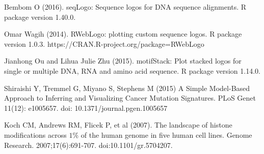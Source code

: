 \documentclass[12pt]{article}\usepackage[]{graphicx}\usepackage[usenames,dvipsnames]{color}
\begin{document}
\begin{thebibliography}{1}

Bembom O (2016).
\newblock seqLogo: Sequence logos for DNA sequence alignments.
\newblock R package version 1.40.0.

Omar Wagih (2014).
\newblock RWebLogo: plotting custom sequence logos.
\newblock R package version 1.0.3. https://CRAN.R-project.org/package=RWebLogo

Jianhong Ou and Lihua Julie Zhu  (2015).
\newblock  motifStack: Plot stacked logos for single or multiple DNA, RNA and amino acid sequence.
\newblock  R package version 1.14.0.

Shiraishi Y, Tremmel G, Miyano S, Stephens M (2015)
\newblock A Simple Model-Based Approach to Inferring and Visualizing Cancer Mutation Signatures.
\newblock PLoS Genet 11(12): e1005657. doi: 10.1371/journal.pgen.1005657

Koch CM, Andrews RM, Flicek P, et al (2007).
\newblock The landscape of histone modifications across $1 \%$ of the human genome in five human cell lines.
\newblock Genome Research. 2007;17(6):691-707. doi:10.1101/gr.5704207.

\end{thebibliography}
\end{document}
